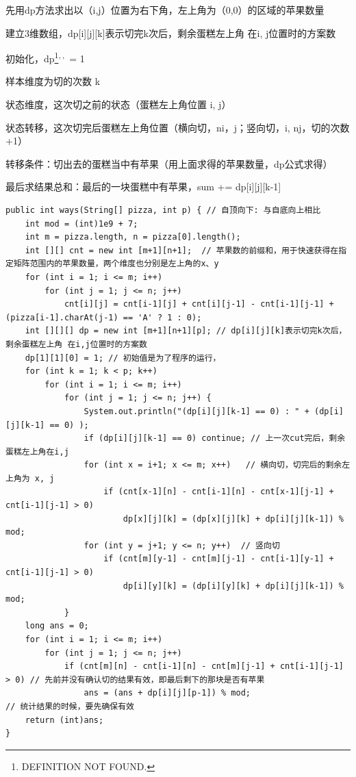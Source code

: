 \documentclass[9pt, b5paaper]{book}
\begin{document}
\begin{enumerate}
先用dp方法求出以（i,j）位置为右下角，左上角为（0,0）的区域的苹果数量

建立3维数组，dp[i][j][k]表示切完k次后，剩余蛋糕左上角 在i, j位置时的方案数

初始化，dp\footnote{DEFINITION NOT FOUND.}\textsuperscript{,}\,\footnotemark[1]{}\textsuperscript{,}\,\footnotemark[1]{} = 1

样本维度为切的次数 k

状态维度，这次切之前的状态（蛋糕左上角位置 i, j）

状态转移，这次切完后蛋糕左上角位置（横向切，ni，j；竖向切，i, nj，切的次数 +1）

转移条件：切出去的蛋糕当中有苹果（用上面求得的苹果数量，dp公式求得）

最后求结果总和：最后的一块蛋糕中有苹果，sum += dp[i][j][k-1]
\begin{verbatim}
public int ways(String[] pizza, int p) { // 自顶向下: 与自底向上相比
    int mod = (int)1e9 + 7;
    int m = pizza.length, n = pizza[0].length();
    int [][] cnt = new int [m+1][n+1];  // 苹果数的前缀和，用于快速获得在指定矩阵范围内的苹果数量，两个维度也分别是左上角的x、y
    for (int i = 1; i <= m; i++) 
        for (int j = 1; j <= n; j++) 
            cnt[i][j] = cnt[i-1][j] + cnt[i][j-1] - cnt[i-1][j-1] + (pizza[i-1].charAt(j-1) == 'A' ? 1 : 0);
    int [][][] dp = new int [m+1][n+1][p]; // dp[i][j][k]表示切完k次后，剩余蛋糕左上角 在i,j位置时的方案数
    dp[1][1][0] = 1; // 初始值是为了程序的运行，
    for (int k = 1; k < p; k++) 
        for (int i = 1; i <= m; i++) 
            for (int j = 1; j <= n; j++) {
                System.out.println("(dp[i][j][k-1] == 0) : " + (dp[i][j][k-1] == 0) );
                if (dp[i][j][k-1] == 0) continue; // 上一次cut完后，剩余蛋糕左上角在i,j
                for (int x = i+1; x <= m; x++)   // 横向切，切完后的剩余左上角为 x, j
                    if (cnt[x-1][n] - cnt[i-1][n] - cnt[x-1][j-1] + cnt[i-1][j-1] > 0)
                        dp[x][j][k] = (dp[x][j][k] + dp[i][j][k-1]) % mod;
                for (int y = j+1; y <= n; y++)  // 竖向切
                    if (cnt[m][y-1] - cnt[m][j-1] - cnt[i-1][y-1] + cnt[i-1][j-1] > 0)
                        dp[i][y][k] = (dp[i][y][k] + dp[i][j][k-1]) % mod;
            }
    long ans = 0;
    for (int i = 1; i <= m; i++) 
        for (int j = 1; j <= n; j++) 
            if (cnt[m][n] - cnt[i-1][n] - cnt[m][j-1] + cnt[i-1][j-1] > 0) // 先前并没有确认切的结果有效，即最后剩下的那块是否有苹果
                ans = (ans + dp[i][j][p-1]) % mod;                         // 统计结果的时候，要先确保有效
    return (int)ans;
}
\end{verbatim}
\end{enumerate}
\end{document}
